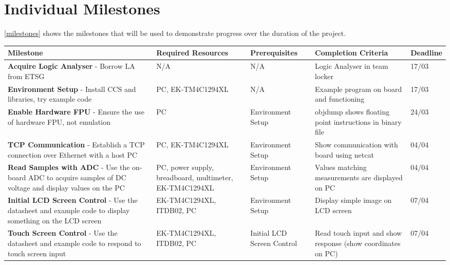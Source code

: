 \documentclass[12pt]{report}
\begin{document}
\chapter{Individual Milestones}
\autoref{milestones} shows the milestones that will be used to demonstrate progress over the duration of the project.
\begin{longtable}{|p{5cm}|p{4cm}|p{2.8cm}|p{2.5cm}|p{1.8cm}|}
	\hline
	\textbf{Milestone} &
	\textbf{Required Resources} &
	\textbf{Prerequisites} &
	\textbf{Completion} \textbf{Criteria} &
	\textbf{Deadline}\\	
	
	\hline
	\textbf{Acquire Logic Analyser} - Borrow LA from ETSG &
	N/A & 
	N/A & 
	Logic Analyser in team locker &
	17/03\\
	
	\hline
	\textbf{Environment Setup} - Install CCS and libraries, try example code&
	PC, EK-TM4C1294XL &
	N/A &
	Example program on board and functioning &
	17/03\\

	\hline
	\textbf{Enable Hardware FPU} - Ensure the use of hardware FPU, not emulation &
	PC &
	Environment Setup &
	objdump shows floating point instructions in binary file &
	24/03\\
		
	\hline
	\textbf{TCP Communication} - Establish a TCP connection over Ethernet with a host PC &
	PC, EK-TM4C1294XL &
	Environment Setup &
	Show communication with board using netcat &
	04/04\\
		
	\hline
	\textbf{Read Samples with ADC} - Use the on-board ADC to acquire samples of DC voltage and display values on the PC &
	PC, power supply, breadboard, multimeter, EK-TM4C1294XL &
	Environment Setup &
	Values matching measurements are displayed on PC&
	04/04\\
		
	\hline
	\textbf{Initial LCD Screen Control} - Use the datasheet and example code to display something on the LCD screen &
	EK-TM4C1294XL, ITDB02, PC&
	Environment Setup &
	Display simple image on LCD screen &
	07/04\\
	
	\hline
	\textbf{Touch Screen Control} - Use the datasheet and example code to respond to touch screen input &
	EK-TM4C1294XL, ITDB02, PC&
	Initial LCD Screen Control &
	Read touch input and show response (show coordinates on PC) &
	07/04\\


\end{longtable}
\end{document}
